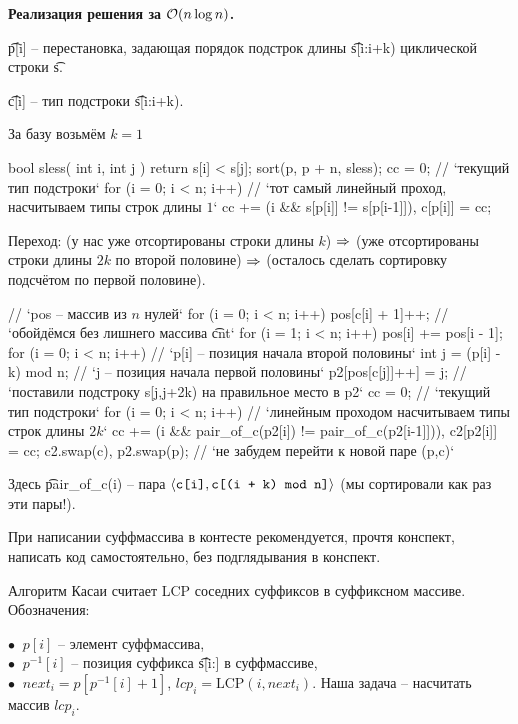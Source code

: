 \down
{\bf Реализация решения за $\mathcal{O}(n \log n)$.}

\t{p[i]} -- перестановка, задающая порядок подстрок длины \t{s[i:i+k)} циклической строки \t{s\NO}.

\t{c[i]} -- тип подстроки  \t{s[i:i+k)}.

За базу возьмём $k=1$
\begin{code}
bool sless( int i, int j ) { return s[i] < s[j]; }
sort(p, p + n, sless);
cc = 0; // `текущий тип подстроки`
for (i = 0; i < n; i++) // `тот самый линейный проход, насчитываем типы строк длины $1$`
	cc += (i && s[p[i]] != s[p[i-1]]), c[p[i]] = cc;
\end{code}
 
Переход: (у нас уже отсортированы строки длины $k$) $\Rightarrow$ (уже отсортированы строки длины $2k$ по второй половине) 
$\Rightarrow$ (осталось сделать сортировку подсчётом по первой половине).

\begin{code}
// `pos -- массив из $n$ нулей`
for (i = 0; i < n; i++)
	pos[c[i] + 1]++; // `обойдёмся без лишнего массива \t{cnt}`
for (i = 1; i < n; i++)
	pos[i] += pos[i - 1];
for (i = 0; i < n; i++) { // `p[i] -- позиция начала второй половины`
	int j = (p[i] - k) mod n; // `j -- позиция начала первой половины`
	p2[pos[c[j]]++] = j; // `поставили подстроку s[j,j+2k) на правильное место в p2`
}
cc = 0; // `текущий тип подстроки`
for (i = 0; i < n; i++) // `линейным проходом насчитываем типы строк длины $2k$`
	cc += (i && pair_of_c(p2[i]) != pair_of_c(p2[i-1]])), c2[p2[i]] = cc;
c2.swap(c), p2.swap(p); // `не забудем перейти к новой паре (p,c)`
\end{code}

Здесь \t{pair\_of\_c(i)} -- пара $\langle \texttt{c[i]}, \texttt{c[(i + k) mod n]} \rangle$ 
(мы сортировали как раз эти пары!).

\down
\begin{Rem}
При написании суффмассива в контесте рекомендуется, прочтя конспект, написать код самостоятельно, без подглядывания в конспект.
\end{Rem}

\up
{}

Алгоритм Касаи считает LCP соседних суффиксов в суффиксном массиве. Обозначения: 

\down
$\bullet\ $ $p[i]$ -- элемент суффмассива, \\
$\bullet\ $ $p^{-1}[i]$ -- позиция суффикса \t{s[i:]} в суффмассиве, \\
$\bullet\ $ $next_i = p[p^{-1}[i]+1]$, $lcp_i = \text{LCP}(i, next_i)$. Наша задача -- насчитать массив $lcp_i$.

